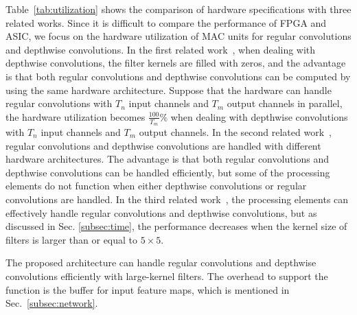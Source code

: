 \documentclass[runningheads]{llncs}
\begin{document}
Table~\ref{tab:utilization} shows the comparison of hardware specifications with three related works. Since it is difficult to compare the performance of FPGA and ASIC, we focus on the hardware utilization of MAC units for regular convolutions and depthwise convolutions. In the first related work~\cite{Liu19}, when dealing with depthwise convolutions, the filter kernels are filled with zeros, and the advantage is that both regular convolutions and depthwise convolutions can be computed by using the same hardware architecture. Suppose that the hardware can handle regular convolutions with $T_n$ input channels and $T_m$ output channels in parallel, the hardware utilization becomes $\frac{100}{T_m}\%$ when dealing with depthwise convolutions with $T_n$ input channels and $T_m$ output channels. In the second related work~\cite{Su18}, regular convolutions and depthwise convolutions are handled with different hardware architectures. The advantage is that both regular convolutions and depthwise convolutions can be handled efficiently, but some of the processing elements do not function when either depthwise convolutions or regular convolutions are handled. In the third related work~\cite{Yu20}, the processing elements can effectively handle regular convolutions and depthwise convolutions, but as discussed in Sec. \ref{subsec:time}, the performance decreases when the kernel size of filters is larger than or equal to $5 \times 5$.

The proposed architecture can handle regular convolutions and depthwise convolutions efficiently with large-kernel filters. The overhead to support the function is the buffer for input feature maps, which is mentioned in Sec.~\ref{subsec:network}. 
\end{document}
